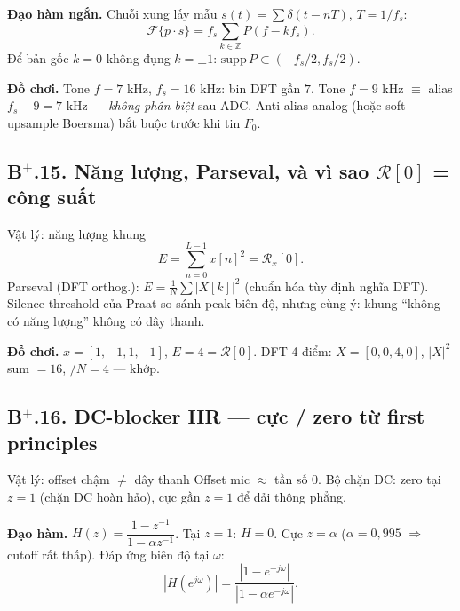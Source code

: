 \noindent\textbf{Đạo hàm ngắn.} Chuỗi xung lấy mẫu $s(t)=\sum\delta(t-nT)$, $T=1/f_s$:
\[
\mathcal{F}\{p\cdot s\}= f_s\sum_{k\in\mathbb{Z}} P(f-kf_s).
\]
Để bản gốc $k=0$ không đụng $k=\pm1$: $\mathrm{supp}\,P\subset(-f_s/2,f_s/2)$.

\noindent\textbf{Đồ chơi.} Tone $f=7\text{ kHz}$, $f_s=16\text{ kHz}$: bin DFT gần $7$. Tone $f=9\text{ kHz}$ $\equiv$ alias $f_s-9=7\text{ kHz}$ --- \emph{không phân biệt} sau ADC. Anti-alias analog (hoặc soft upsample Boersma) bắt buộc trước khi tin $F_0$.

\subsection*{B$^+$.15. Năng lượng, Parseval, và vì sao $\mathcal{R}[0]$ = công suất}

\begin{firstprin}{Vật lý: năng lượng khung}
\[
E=\sum_{n=0}^{L-1}x[n]^2=\mathcal{R}_x[0].
\]
Parseval (DFT orthog.): $E=\frac1N\sum|X[k]|^2$ (chuẩn hóa tùy định nghĩa DFT). Silence threshold của Praat so sánh peak biên độ, nhưng cùng ý: khung ``không có năng lượng'' không có dây thanh.
\end{firstprin}

\noindent\textbf{Đồ chơi.} $x=[1,-1,1,-1]$, $E=4=\mathcal{R}[0]$. DFT 4 điểm: $X=[0,0,4,0]$, $|X|^2$ sum $=16$, $/N=4$ --- khớp.

\subsection*{B$^+$.16. DC-blocker IIR --- cực / zero từ first principles}

\begin{firstprin}{Vật lý: offset chậm $\neq$ dây thanh}
Offset mic $\approx$ tần số $0$. Bộ chặn DC: zero tại $z=1$ (chặn DC hoàn hảo), cực gần $z=1$ để dải thông phẳng.
\end{firstprin}

\noindent\textbf{Đạo hàm.} $H(z)=\dfrac{1-z^{-1}}{1-\alpha z^{-1}}$. Tại $z=1$: $H=0$. Cực $z=\alpha$ ($\alpha=0{,}995$ $\Rightarrow$ cutoff rất thấp).
Đáp ứng biên độ tại $\omega$:
\[
|H(e^{j\omega})|=\frac{|1-e^{-j\omega}|}{|1-\alpha e^{-j\omega}|}.
\]

